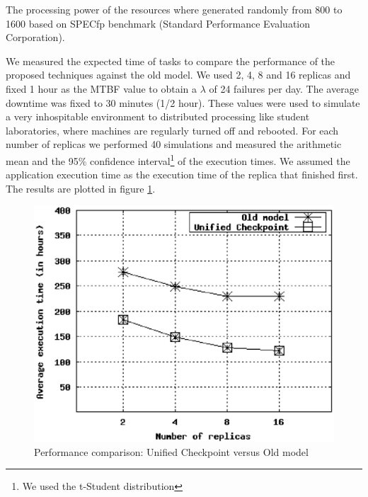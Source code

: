 \documentclass[times, 09pt, twocolumn]{article}
\begin{document}
The processing power of the resources where generated randomly from 800 to 1600
based on SPECfp benchmark (Standard Performance Evaluation Corporation). 

We measured the expected time of tasks to compare the performance of the
proposed techniques against the old model. We used 2, 4, 8 and 16 replicas and
fixed 1 hour as the MTBF value to obtain a $\lambda$ of 24 failures per day.
The average downtime was fixed to 30 minutes (1/2 hour). These values were used to
simulate a very inhospitable environment to distributed processing like
student laboratories, where machines are regularly turned off and rebooted.
For each number of replicas we performed 40 simulations and measured the
arithmetic mean and the 95\% confidence interval\footnote{We used the t-Student
distribution} of the execution times. We assumed the application execution time
as the execution time of the replica that finished first. The results are
plotted in figure \ref{fig:adapt-mag}.

\begin{figure}[th]
\centering \includegraphics[width=1.1\columnwidth]{49-55_scenario.eps}
\caption{Performance comparison: Unified Checkpoint versus Old model}
\label{fig:adapt-mag}
\end{figure}
\end{document}
